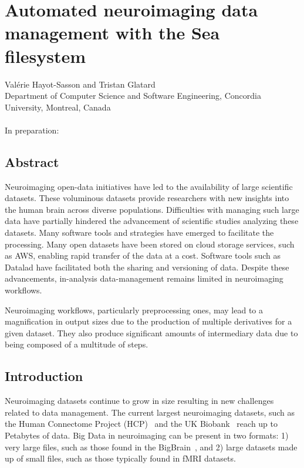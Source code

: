 \chapter{Automated neuroimaging data management with the Sea filesystem}

Val\'erie Hayot-Sasson and Tristan Glatard \\
\begingroup \footnotesize
Department of Computer Science and Software Engineering, Concordia University, Montreal, Canada \\
\endgroup 
\vspace{5pt} \\
In preparation: \\

\section{Abstract}
	Neuroimaging open-data initiatives have led to the availability of large scientific datasets. These voluminous
	datasets provide researchers with new insights into the human brain across diverse populations. Difficulties with
	managing such large data have partially hindered the advancement of scientific studies analyzing these datasets. Many
	software tools and strategies have emerged to facilitate the processing. Many open datasets have been stored on cloud storage
	services, such as AWS, enabling rapid transfer of the data at a cost. Software tools such as Datalad have facilitated both the
	sharing and versioning of data. Despite these advancements, in-analysis data-management  remains limited in neuroimaging workflows.
    
	Neuroimaging workflows, particularly preprocessing ones, may lead to a magnification in output sizes due to the production 
  of multiple derivatives for a given dataset. They also produce
	significant amounts of intermediary data due to being composed of a multitude of steps. 
    \section{Introduction}\label{sec:sea_neuro:introduction}
    
    Neuroimaging datasets continue to grow in size resulting in new challenges related
    to data management. The current largest neuroimaging datasets, such as the Human Connectome Project (HCP)~\cite{HCP}
    and the UK Biobank~\cite{ukbiobank} reach up to Petabytes of data. Big Data in neuroimaging can be present in two formats: 1)
    very large files, such as those found in the BigBrain~\cite{bigbrain}, and 2) large datasets made up of small files,
    such as those typically found in fMRI datasets. 
    
